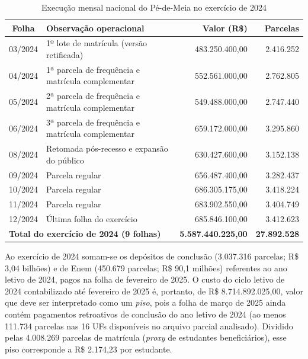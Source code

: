 \begin{table}[!htb]
    \centering
    \caption{Execução mensal nacional do Pé-de-Meia no exercício de 2024}
    \label{tab_execucao_mensal}
    \small
    \begin{tabularx}{\textwidth}{cXrr}
        \toprule
        \textbf{Folha} & \textbf{Observação operacional} & \textbf{Valor (R\$)} & \textbf{Parcelas} \\
        \midrule
        03/2024 & 1º lote de matrícula (versão retificada) & 483.250.400,00 & 2.416.252 \\
        04/2024 & 1ª parcela de frequência e matrícula complementar & 552.561.000,00 & 2.762.805 \\
        05/2024 & 2ª parcela de frequência e matrícula complementar & 549.488.000,00 & 2.747.440 \\
        06/2024 & 3ª parcela de frequência e matrícula complementar & 659.172.000,00 & 3.295.860 \\
        08/2024 & Retomada pós-recesso e expansão do público & 630.427.600,00 & 3.152.138 \\
        09/2024 & Parcela regular & 656.487.400,00 & 3.282.437 \\
        10/2024 & Parcela regular & 686.305.175,00 & 3.418.224 \\
        11/2024 & Parcela regular & 683.902.550,00 & 3.404.749 \\
        12/2024 & Última folha do exercício & 685.846.100,00 & 3.412.623 \\
        \midrule
        \multicolumn{2}{l}{\textbf{Total do exercício de 2024 (9 folhas)}} & \textbf{5.587.440.225,00} & \textbf{27.892.528} \\
        \bottomrule
    \end{tabularx}
\end{table}

Ao exercício de 2024 somam-se os depósitos de conclusão (3.037.316 parcelas; R\$ 3,04 bilhões) e de Enem (450.679 parcelas; R\$ 90,1 milhões) referentes ao ano letivo de 2024, pagos na folha de fevereiro de 2025.
O custo do ciclo letivo de 2024 contabilizado até fevereiro de 2025 é, portanto, de R\$ 8.714.892.025,00, valor que deve ser interpretado como um \textit{piso}, pois a folha de março de 2025 ainda contém pagamentos retroativos de conclusão do ano letivo de 2024 (ao menos 111.734 parcelas nas 16 UFs disponíveis no arquivo parcial analisado).
Dividido pelas 4.008.269 parcelas de matrícula (\textit{proxy} de estudantes beneficiários), esse piso corresponde a R\$ 2.174,23 por estudante.


